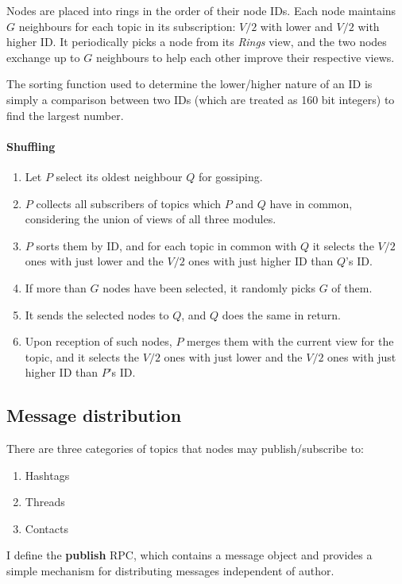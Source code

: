 \documentclass[10pt,a4paper,onecolumn]{article}
\begin{document}
Nodes are placed into rings in the order of their node IDs. Each node maintains $G$ neighbours for each topic in its subscription: $V/2$ with lower and $V/2$ with higher ID. It periodically picks a node from its \textit{Rings} view, and the two nodes exchange up to $G$ neighbours to help each other improve their respective views.

The sorting function used to determine the lower/higher nature of an ID is simply a comparison between two IDs (which are treated as 160 bit integers) to find the largest number.

\paragraph*{Shuffling}
\begin{enumerate}
\item Let $P$ select its oldest neighbour $Q$ for gossiping.
\item $P$ collects all subscribers of topics which $P$ and $Q$ have in common, considering the union of views of all three modules.
\item $P$ sorts them by ID, and for each topic in common with $Q$ it selects the $V/2$ ones with just lower and the $V/2$ ones with just higher ID than $Q$'s ID. 
\item If more than $G$ nodes have been selected, it randomly picks $G$ of them.
\item It sends the selected nodes to $Q$, and $Q$ does the same in return.
\item Upon reception of such nodes, $P$ merges them with the current view for the topic, and it selects the $V/2$ ones with just lower and the $V/2$ ones with just higher ID than $P$'s ID.
\end{enumerate}

\subsection{Message distribution}
There are three categories of topics that nodes may publish/subscribe to:
\begin{enumerate}
\item Hashtags
\item Threads
\item Contacts
\end{enumerate}

I define the \textbf{publish} RPC, which contains a message object and provides a simple mechanism for distributing messages independent of author. 
\end{document}

